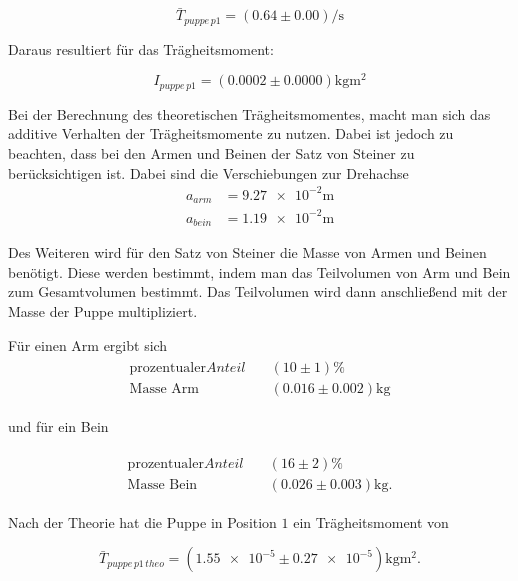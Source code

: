 \begin{equation*}
\bar{T}_{puppe\, p1}=\left(\num{0.64}\pm\num{0.00}\right) \si{\per\second}
\end{equation*}

Daraus resultiert für das Trägheitsmoment:

\begin{equation}
\label{eq:traeg_puppe_p1}
I_{puppe \,p1}= \left(\num{0.0002}\pm\num{0.0000}\right)\si{\kilogram\meter\squared}
\end{equation}

Bei der Berechnung des theoretischen Trägheitsmomentes, macht man sich
das additive Verhalten der Trägheitsmomente zu nutzen.
Dabei ist jedoch zu beachten, dass bei den Armen und Beinen der
Satz von Steiner zu berücksichtigen ist. %
 Dabei sind die Verschiebungen zur Drehachse
\begin{align*}
a_{arm}&=\num{9.27e-2}\si{\meter}\\
a_{bein}&=\num{1.19e-2}\si{\meter}
\end{align*}

Des Weiteren wird für den Satz von Steiner die Masse von Armen und Beinen benötigt.
Diese werden bestimmt, indem man das Teilvolumen von Arm und Bein zum Gesamtvolumen bestimmt. %
Das Teilvolumen wird dann anschließend mit der Masse der Puppe multipliziert.

Für einen Arm ergibt sich
\begin{align}
\begin{aligned}
\label{eq:masse_arm}
\text{prozentualer} Anteil \quad &\left(10\pm\num{1}\right)\% \\
\text{Masse Arm} \quad &\left(\num{0.016}\pm\num{0.002}\right)\si{\kilogram}
\end{aligned}
\end{align}

und für ein Bein

\begin{align}
\begin{aligned}
\label{eq:masse_bein}
\text{prozentualer} Anteil \quad &\left(16\pm\num{2}\right)\% \\
\text{Masse Bein} \quad &\left(\num{0.026}\pm\num{0.003}\right)\si{\kilogram}.
\end{aligned}
\end{align}

Nach der Theorie hat die Puppe in Position $1$ ein Trägheitsmoment von

\begin{equation*}
\bar{T}_{puppe\, p1\,theo}=\left(\num{1.55e-5}\pm\num{0.27e-5}\right) \si{\kilogram\meter\squared}.
\end{equation*}

